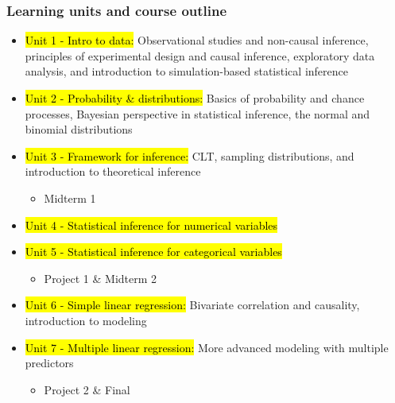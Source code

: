 \documentclass[slidestop,compress,mathserif,12pt,t,professionalfonts,xcolor=table]{beamer}
\begin{document}
\begin{frame}
\frametitle{Learning units and course outline}

{\footnotesize
\begin{itemize}[<+->]
\item \hl{Unit 1 - Intro to data:} Observational studies and non-causal inference, principles of experimental design and causal inference, exploratory data analysis, and introduction to simulation-based statistical inference
\item \hl{Unit 2 - Probability \& distributions:} Basics of probability and chance processes, Bayesian perspective in statistical inference, the normal and binomial distributions
\item \hl{Unit 3 - Framework for inference:} CLT, sampling distributions, and introduction to theoretical inference
\begin{itemize}
\item Midterm 1
\end{itemize}
\item \hl{Unit 4 - Statistical inference for numerical variables}
\item \hl{Unit 5 - Statistical inference for categorical variables}
\begin{itemize}
\item Project 1 \& Midterm 2
\end{itemize}
\item \hl{Unit 6 - Simple linear regression:} Bivariate correlation and causality, introduction to modeling
\item \hl{Unit 7 - Multiple linear regression:} More advanced modeling with multiple predictors
\begin{itemize}
\item Project 2 \& Final
\end{itemize}
\end{itemize}
}


\end{frame}
\end{document}
